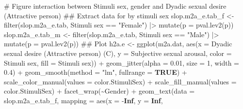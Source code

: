 \documentclass[
  bookmarksnumbered]{article}
\newenvironment{Shaded}{\begin{snugshade}}{\end{snugshade}}
\newcommand{\AttributeTok}[1]{\textcolor[rgb]{0.80,0.80,0.80}{#1}}
\newcommand{\CommentTok}[1]{\textcolor[rgb]{0.50,0.62,0.50}{#1}}
\newcommand{\ConstantTok}[1]{\textcolor[rgb]{0.86,0.64,0.64}{\textbf{#1}}}
\newcommand{\DecValTok}[1]{\textcolor[rgb]{0.86,0.86,0.80}{#1}}
\newcommand{\DocumentationTok}[1]{\textcolor[rgb]{0.50,0.62,0.50}{#1}}
\newcommand{\FloatTok}[1]{\textcolor[rgb]{0.75,0.75,0.82}{#1}}
\newcommand{\FunctionTok}[1]{\textcolor[rgb]{0.94,0.94,0.56}{#1}}
\newcommand{\NormalTok}[1]{\textcolor[rgb]{0.80,0.80,0.80}{#1}}
\newcommand{\OtherTok}[1]{\textcolor[rgb]{0.94,0.94,0.56}{#1}}
\newcommand{\SpecialCharTok}[1]{\textcolor[rgb]{0.86,0.64,0.64}{#1}}
\newcommand{\StringTok}[1]{\textcolor[rgb]{0.80,0.58,0.58}{#1}}
\begin{document}
\begin{Shaded}
\begin{Highlighting}[]
\CommentTok{\# Figure interaction between Stimuli sex, gender and Dyadic sexual desire (Attractive person)}
\DocumentationTok{\#\# Extract data for by stimuli sex}
\NormalTok{slop.m2a\_e.tab\_f }\OtherTok{\textless{}{-}} \FunctionTok{filter}\NormalTok{(slop.m2a\_e.tab, }\StringTok{\textasciigrave{}}\AttributeTok{Stimuli sex}\StringTok{\textasciigrave{}} \SpecialCharTok{==} \StringTok{"Female"}\NormalTok{) }\SpecialCharTok{|\textgreater{}}
  \FunctionTok{mutate}\NormalTok{(}\AttributeTok{p =} \FunctionTok{pval.lev2}\NormalTok{(p))}
\NormalTok{slop.m2a\_e.tab\_m }\OtherTok{\textless{}{-}} \FunctionTok{filter}\NormalTok{(slop.m2a\_e.tab, }\StringTok{\textasciigrave{}}\AttributeTok{Stimuli sex}\StringTok{\textasciigrave{}} \SpecialCharTok{==} \StringTok{"Male"}\NormalTok{) }\SpecialCharTok{|\textgreater{}}
  \FunctionTok{mutate}\NormalTok{(}\AttributeTok{p =} \FunctionTok{pval.lev2}\NormalTok{(p))}
\DocumentationTok{\#\# Plot}
\NormalTok{h2a.e }\OtherTok{\textless{}{-}} \FunctionTok{ggplot}\NormalTok{(m2a.dat, }\FunctionTok{aes}\NormalTok{(}\AttributeTok{x =} \StringTok{\textasciigrave{}}\AttributeTok{Dyadic sexual desire (Attractive person) (C)}\StringTok{\textasciigrave{}}\NormalTok{,}
                             \AttributeTok{y =} \StringTok{\textasciigrave{}}\AttributeTok{Subjective sexual arousal}\StringTok{\textasciigrave{}}\NormalTok{,}
                             \AttributeTok{color =} \StringTok{\textasciigrave{}}\AttributeTok{Stimuli sex}\StringTok{\textasciigrave{}}\NormalTok{, }\AttributeTok{fill =} \StringTok{\textasciigrave{}}\AttributeTok{Stimuli sex}\StringTok{\textasciigrave{}}\NormalTok{)) }\SpecialCharTok{+}
  \FunctionTok{geom\_jitter}\NormalTok{(}\AttributeTok{alpha =} \FloatTok{0.01}\NormalTok{, }\AttributeTok{size =} \DecValTok{1}\NormalTok{, }\AttributeTok{width =} \FloatTok{0.4}\NormalTok{) }\SpecialCharTok{+}
  \FunctionTok{geom\_smooth}\NormalTok{(}\AttributeTok{method =} \StringTok{"lm"}\NormalTok{, }\AttributeTok{fullrange =} \ConstantTok{TRUE}\NormalTok{) }\SpecialCharTok{+}
  \FunctionTok{scale\_color\_manual}\NormalTok{(}\AttributeTok{values =}\NormalTok{ color.StimuliSex) }\SpecialCharTok{+}
  \FunctionTok{scale\_fill\_manual}\NormalTok{(}\AttributeTok{values =}\NormalTok{ color.StimuliSex) }\SpecialCharTok{+}
  \FunctionTok{facet\_wrap}\NormalTok{(}\SpecialCharTok{\textasciitilde{}}\NormalTok{Gender) }\SpecialCharTok{+}
  \FunctionTok{geom\_text}\NormalTok{(}\AttributeTok{data =}\NormalTok{ slop.m2a\_e.tab\_f,}
            \AttributeTok{mapping =} \FunctionTok{aes}\NormalTok{(}\AttributeTok{x =} \SpecialCharTok{{-}}\ConstantTok{Inf}\NormalTok{, }\AttributeTok{y =} \ConstantTok{Inf}\NormalTok{,}

\end{Highlighting}
\end{Shaded}
\end{document}
